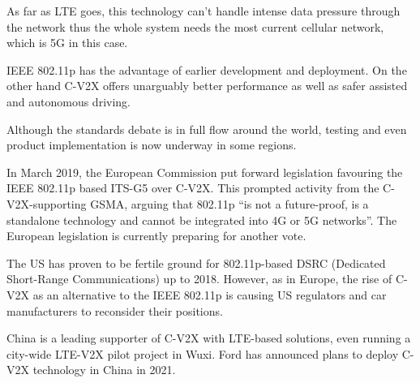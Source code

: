 \documentclass[conference]{IEEEtran}
\begin{document}
As far as LTE goes, this technology can’t handle intense data pressure through the network thus the whole system needs the most current cellular network, which is 5G in this case.

IEEE 802.11p has the advantage of earlier development and deployment. On the other hand C-V2X offers unarguably better performance as well as safer assisted and autonomous driving.

Although the standards debate is in full flow around the world, testing and even product implementation is now underway in some regions.

In March 2019, the European Commission put forward legislation favouring the IEEE 802.11p based ITS-G5 over C-V2X. This prompted activity from the C-V2X-supporting GSMA, arguing that 802.11p “is not a future-proof, is a standalone technology and cannot be integrated into 4G or 5G networks”. The European legislation is currently preparing for another vote.

The US has proven to be fertile ground for 802.11p-based DSRC (Dedicated Short-Range Communications) up to 2018. However,  as in Europe, the rise of C-V2X as an alternative to the IEEE 802.11p is causing US regulators and car manufacturers to reconsider their positions.

China is a leading supporter of C-V2X with LTE-based solutions, even running a city-wide LTE-V2X pilot project in Wuxi. Ford has announced plans to deploy C-V2X technology in China in 2021.
\end{document}
